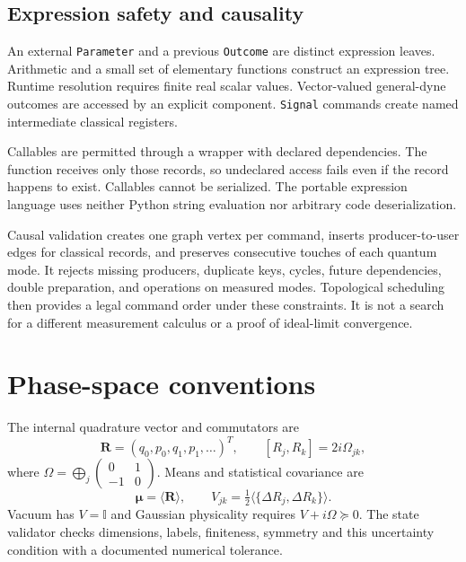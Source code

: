 \documentclass[a4paper,twocolumn,11pt,nopdfoutputerror]{quantumarticle}
\newcommand{\I}{\mathbb{I}}
\begin{document}
\subsection{Expression safety and causality}

An external \texttt{Parameter} and a previous \texttt{Outcome} are distinct
expression leaves. Arithmetic and a small set of elementary functions construct
an expression tree. Runtime resolution requires finite real scalar values.
Vector-valued general-dyne outcomes are accessed by an explicit component.
\texttt{Signal} commands create named intermediate classical registers.

Callables are permitted through a wrapper with declared dependencies. The
function receives only those records, so undeclared access fails even if the
record happens to exist. Callables cannot be serialized. The portable expression
language uses neither Python string evaluation nor arbitrary code deserialization.

Causal validation creates one graph vertex per command, inserts producer-to-user
edges for classical records, and preserves consecutive touches of each quantum
mode. It rejects missing producers, duplicate keys, cycles, future dependencies,
double preparation, and operations on measured modes. Topological scheduling
then provides a legal command order under these constraints. It is not a search
for a different measurement calculus or a proof of ideal-limit convergence.

\section{Phase-space conventions}
\label{sec:conventions}

The internal quadrature vector and commutators are
\begin{equation}
 \bm R=(q_0,p_0,q_1,p_1,\ldots)^T,\qquad
 [R_j,R_k]=2i\Omega_{jk},
\end{equation}
where $\Omega=\bigoplus_j\left(\begin{smallmatrix}0&1\\-1&0\end{smallmatrix}\right)$.
Means and statistical covariance are
\begin{equation}
 \bm\mu=\langle\bm R\rangle,\qquad
 V_{jk}=\tfrac12\langle\{\Delta R_j,\Delta R_k\}\rangle.
\end{equation}
Vacuum has $V=\I$ and Gaussian physicality requires $V+i\Omega\succeq0$.
The state validator checks dimensions, labels, finiteness, symmetry and this
uncertainty condition with a documented numerical tolerance.
\end{document}
